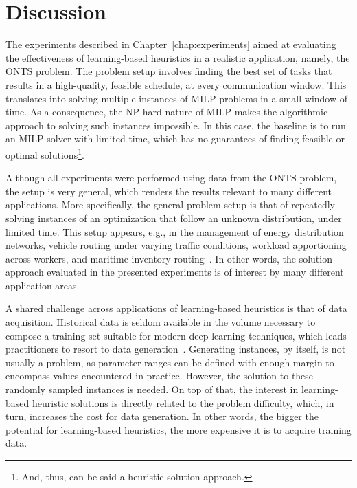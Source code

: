 

\chapter{Discussion}\label{chap:discussion}

The experiments described in Chapter~\ref{chap:experiments} aimed at evaluating the effectiveness of learning-based heuristics in a realistic application, namely, the ONTS problem.
The problem setup involves finding the best set of tasks that results in a high-quality, feasible schedule, at every communication window.
This translates into solving multiple instances of MILP problems in a small window of time.
As a consequence, the NP-hard nature of MILP makes the algorithmic approach to solving such instances impossible.
In this case, the baseline is to run an MILP solver with limited time, which has no guarantees of finding feasible or optimal solutions\footnote{And, thus, can be said a heuristic solution approach.}.

Although all experiments were performed using data from the ONTS problem, the setup is very general, which renders the results relevant to many different applications.
More specifically, the general problem setup is that of repeatedly solving instances of an optimization that follow an unknown distribution, under limited time.
This setup appears, e.g., in the management of energy distribution networks, vehicle routing under varying traffic conditions, workload apportioning across workers, and maritime inventory routing~\cite{gasseMachineLearningCombinatorial2022,papageorgiouMIRPLibLibraryMaritime2014}.
In other words, the solution approach evaluated in the presented experiments is of interest by many different application areas.

A shared challenge across applications of learning-based heuristics is that of data acquisition.
Historical data is seldom available in the volume necessary to compose a training set suitable for modern deep learning techniques, which leads practitioners to resort to data generation~\cite{bengioMachineLearningCombinatorial2021}.
Generating instances, by itself, is not usually a problem, as parameter ranges can be defined with enough margin to encompass values encountered in practice.
However, the solution to these randomly sampled instances is needed.
On top of that, the interest in learning-based heuristic solutions is directly related to the problem difficulty, which, in turn, increases the cost for data generation.
In other words, the bigger the potential for learning-based heuristics, the more expensive it is to acquire training data.

